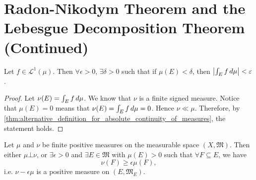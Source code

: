 \documentclass[notoc,notitlepage]{tufte-book}
\begin{document}
\section{Radon-Nikodym Theorem and the Lebesgue Decomposition Theorem (Continued)}%
\label{sec:radon_nikodym_theorem_and_the_lebesgue_decomposition_theorem_continued}

\begin{crly}\label{crly:on_a_special_signed_measure}
  Let $f \in \mathcal{L}^1(\mu)$. Then $\forall \epsilon > 0$,
  $\exists \delta > 0$ such that if $\mu(E) < \delta$, then $\left|\int_{E} f
  \mathop{}\!d{\mu}\right| < \varepsilon$.
\end{crly}

\begin{proof}
  Let $\nu(E) = \int_{E} f \mathop{}\!d{\mu}$.
  We know that $\nu$ is a finite signed measure.
  Notice that $\mu(E) = 0$ means that $\nu(E) = \int_{E} f \mathop{}\!d{\mu} = 0$.
  Hence $\nu \ll \mu$.
  Therefore, by
  \cref{thm:alternative_definition_for_absolute_continuity_of_measures},
  the statement holds.
\end{proof}

\begin{lemma}\label{lemma:relationship_between_two_finite_positive_measure}
  Let $\mu$ and $\nu$ be finite positive measures
  on the measurable space $(X, \mathfrak{M})$.
  Then either $\mu \bot \nu$, or 
  $\exists \epsilon > 0$ and $\exists E \in \mathfrak{M}$
  with $\mu(E) > 0$ such that $\forall F \subseteq E$, we have
  \begin{equation*}
    \nu(F) \geq \epsilon \mu(F),
  \end{equation*}
  i.e. $\nu - \epsilon \mu$ is a positive measure on $(E, \mathfrak{M}_{E})$.
\end{lemma}
\end{document}
